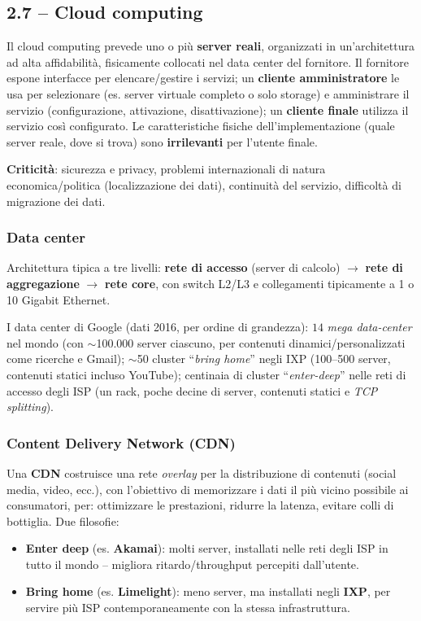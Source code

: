 \documentclass[12pt, a4paper]{article}
\begin{document}
\subsection{2.7 -- Cloud computing}

Il cloud computing prevede uno o più \textbf{server reali}, organizzati in un'architettura ad alta affidabilità, fisicamente collocati nel data center del fornitore. Il fornitore espone interfacce per elencare/gestire i servizi; un \textbf{cliente amministratore} le usa per selezionare (es. server virtuale completo o solo storage) e amministrare il servizio (configurazione, attivazione, disattivazione); un \textbf{cliente finale} utilizza il servizio così configurato. Le caratteristiche fisiche dell'implementazione (quale server reale, dove si trova) sono \textbf{irrilevanti} per l'utente finale.

\textbf{Criticità}: sicurezza e privacy, problemi internazionali di natura economica/politica (localizzazione dei dati), continuità del servizio, difficoltà di migrazione dei dati.

\subsubsection{Data center}

Architettura tipica a tre livelli: \textbf{rete di accesso} (server di calcolo) $\to$ \textbf{rete di aggregazione} $\to$ \textbf{rete core}, con switch L2/L3 e collegamenti tipicamente a 1 o 10 Gigabit Ethernet.

I data center di Google (dati 2016, per ordine di grandezza): $14$ \textit{mega data-center} nel mondo (con $\sim$100.000 server ciascuno, per contenuti dinamici/personalizzati come ricerche e Gmail); $\sim$50 cluster ``\textit{bring home}'' negli IXP (100--500 server, contenuti statici incluso YouTube); centinaia di cluster ``\textit{enter-deep}'' nelle reti di accesso degli ISP (un rack, poche decine di server, contenuti statici e \textit{TCP splitting}).

\subsubsection{Content Delivery Network (CDN)}

Una \textbf{CDN} costruisce una rete \textit{overlay} per la distribuzione di contenuti (social media, video, ecc.), con l'obiettivo di memorizzare i dati il più vicino possibile ai consumatori, per: ottimizzare le prestazioni, ridurre la latenza, evitare colli di bottiglia. Due filosofie:
\begin{itemize}
    \item \textbf{Enter deep} (es. \textbf{Akamai}): molti server, installati nelle reti degli ISP in tutto il mondo -- migliora ritardo/throughput percepiti dall'utente.
    \item \textbf{Bring home} (es. \textbf{Limelight}): meno server, ma installati negli \textbf{IXP}, per servire più ISP contemporaneamente con la stessa infrastruttura.
\end{itemize}
\end{document}
